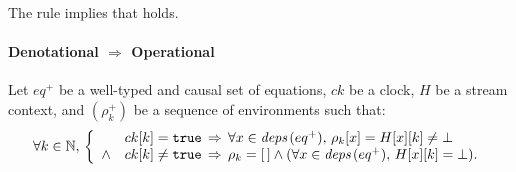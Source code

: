 \begin{skippableproof}
    The rule  implies that  holds.

    \paragraph{Denotational $\Rightarrow$ Operational}
    Let $eq^+$ be a well-typed and causal set of \GRSync equations, $ck$ be a clock, $H$ be a stream
    context, and $(\rho_k^+)$ be a sequence of environments such that:
    \begin{equation*}
        \forall k \in \mathbb{N}, \,
        \left\{
        \begin{array}{ll}
                   & ck[k] = \mathtt{{true}} \, \Rightarrow \,
            \forall x \in {\ensuremath{\textit{deps}\left(eq^+\right)}}, \, \rho_k[x] = H[x][k] \neq \bot               \\
            \wedge & ck[k] \neq \mathtt{{true}} \, \Rightarrow \,
            \rho_k = [\,] \wedge (\forall x \in {\ensuremath{\textit{deps}\left(eq^+\right)}}, \, H[x][k] = \bot). \\
        \end{array}
        \right.
    \end{equation*}


\end{skippableproof}
